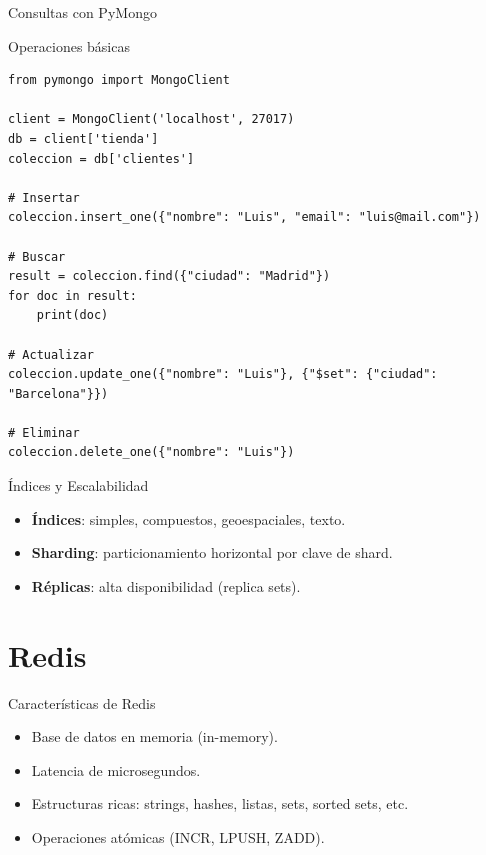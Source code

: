 \documentclass[aspectratio=169, 10pt, xcolor=table]{beamer}
\begin{document}
\begin{frame}[fragile]{Consultas con PyMongo}
    \begin{block}{Operaciones básicas}
        \begin{lstlisting}[style=python]
from pymongo import MongoClient

client = MongoClient('localhost', 27017)
db = client['tienda']
coleccion = db['clientes']

# Insertar
coleccion.insert_one({"nombre": "Luis", "email": "luis@mail.com"})

# Buscar
result = coleccion.find({"ciudad": "Madrid"})
for doc in result:
    print(doc)

# Actualizar
coleccion.update_one({"nombre": "Luis"}, {"$set": {"ciudad": "Barcelona"}})

# Eliminar
coleccion.delete_one({"nombre": "Luis"})
        \end{lstlisting}
    \end{block}
\end{frame}

\begin{frame}{Índices y Escalabilidad}
    \begin{itemize}
        \item \textbf{Índices}: simples, compuestos, geoespaciales, texto.
        \item \textbf{Sharding}: particionamiento horizontal por clave de shard.
        \item \textbf{Réplicas}: alta disponibilidad (replica sets).
    \end{itemize}
\end{frame}

\section{Redis}

\begin{frame}{Características de Redis}
    \begin{itemize}
        \item Base de datos en memoria (in-memory).
        \item Latencia de microsegundos.
        \item Estructuras ricas: strings, hashes, listas, sets, sorted sets, etc.
        \item Operaciones atómicas (INCR, LPUSH, ZADD).
    \end{itemize}
\end{frame}
\end{document}

